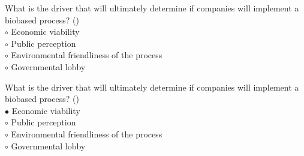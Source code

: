 \documentclass[]{beamer}
\begin{document}
\begin{CJK}{UTF8}{gbsn}
\begin{frame}[shrink] {}
\addtocounter{questions}{1}
\color{blue}
What is the driver that will ultimately determine if companies will implement a biobased process?
({})\\
\color{black}
\setlength{\parindent}{-0.4cm}
{\color{red}$\circ$}  Economic viability   \\
{\color{red}$\circ$} Public perception  \\
{\color{red}$\circ$} Environmental friendliness of the process   \\
{\color{red}$\circ$} Governmental lobby  \\
\end{frame}
\begin{frame}[shrink] {}
\addtocounter{answers}{1}
\color{blue}
What is the driver that will ultimately determine if companies will implement a biobased process?
({})\\
\color{black}
\setlength{\parindent}{-0.4cm}
{\color{red}$\bullet$} Economic viability   \\
{\color{red}$\circ$} Public perception  \\
{\color{red}$\circ$} Environmental friendliness of the process   \\
{\color{red}$\circ$} Governmental lobby  \\
\end{frame}



\end{CJK}
\end{document}
